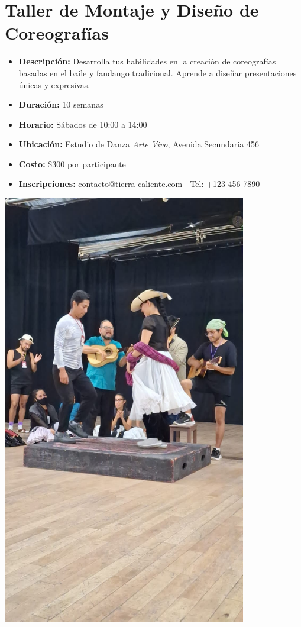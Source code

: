 \documentclass[a4paper,12pt]{article}
\begin{document}
\section{Taller de Montaje y Diseño de Coreografías}
\begin{itemize}
    \item \textbf{Descripción:} Desarrolla tus habilidades en la creación de coreografías basadas en el baile y fandango tradicional. Aprende a diseñar presentaciones únicas y expresivas.
    \item \textbf{Duración:} 10 semanas
    \item \textbf{Horario:} Sábados de 10:00 a 14:00
    \item \textbf{Ubicación:} Estudio de Danza \emph{Arte Vivo}, Avenida Secundaria 456
    \item \textbf{Costo:} \$300 por participante
    \item \textbf{Inscripciones:} \href{mailto:contacto@tierra-caliente.com}{contacto@tierra-caliente.com} | Tel: +123 456 7890
\end{itemize}

\begin{center}
    \includegraphics[width=0.8\textwidth]{baile.jpg} %
\end{center}
\end{document}
